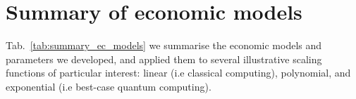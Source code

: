 %
%

\section{Summary of economic models}\label{sec:summary_economic_models}

 Tab.~\ref{tab:summary_ec_models} we summarise the economic models and parameters we developed, and applied them to several illustrative scaling functions of particular interest: linear (i.e classical computing), polynomial, and exponential (i.e best-case quantum computing).


\startnormtable
\renewcommand{\arraystretch}{0.5}

